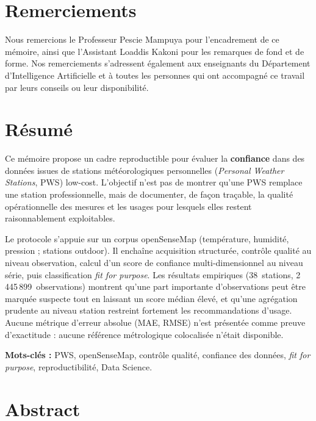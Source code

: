 \documentclass[12pt,a4paper]{report}
\begin{document}
\chapter*{Remerciements}
Nous remercions le Professeur Pescie Mampuya pour l'encadrement de ce mémoire,
ainsi que l'Assistant Loaddis Kakoni pour les remarques de fond et de forme.
Nos remerciements s'adressent également aux enseignants du Département
d'Intelligence Artificielle et à toutes les personnes qui ont accompagné ce
travail par leurs conseils ou leur disponibilité.
\cleardoublepage

\chapter*{Résumé}

Ce mémoire propose un cadre reproductible pour évaluer la \textbf{confiance}
dans des données issues de stations météorologiques personnelles
(\textit{Personal Weather Stations}, PWS) low-cost. L'objectif n'est pas de
montrer qu'une PWS remplace une station professionnelle, mais de documenter,
de façon traçable, la qualité opérationnelle des mesures et les usages pour
lesquels elles restent raisonnablement exploitables.

Le protocole s'appuie sur un corpus openSenseMap (température, humidité,
pression ; stations outdoor). Il enchaîne acquisition structurée, contrôle
qualité au niveau observation, calcul d'un score de confiance
multi-dimensionnel au niveau série, puis classification
\textit{fit for purpose}. Les résultats empiriques (38~stations,
2\,445\,899~observations) montrent qu'une part importante d'observations
peut être marquée suspecte tout en laissant un score médian élevé, et qu'une
agrégation prudente au niveau station restreint fortement les recommandations
d'usage. Aucune métrique d'erreur absolue (MAE, RMSE) n'est présentée comme
preuve d'exactitude : aucune référence métrologique colocalisée n'était
disponible.

\textbf{Mots-clés :} PWS, openSenseMap, contrôle qualité, confiance des données,
\textit{fit for purpose}, reproductibilité, Data Science.
\cleardoublepage

\chapter*{Abstract}
\end{document}
